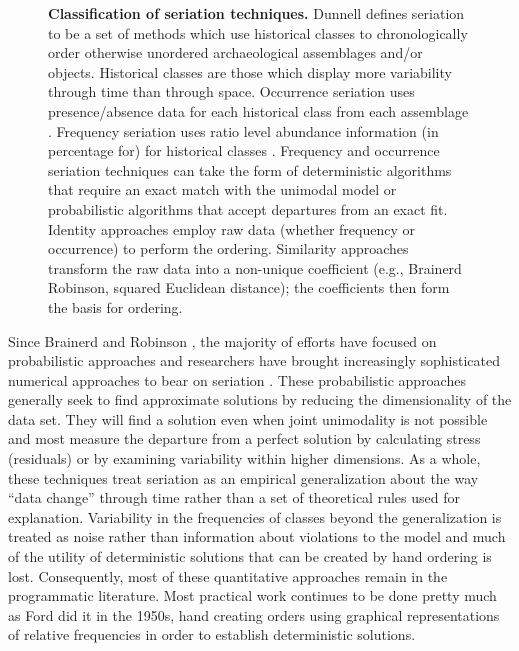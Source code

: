 \documentclass[10pt,letterpaper]{article}
\begin{document}
\begin{figure}[h]
\caption{{\bf Classification of seriation techniques.} Dunnell \cite{Dunnell:1981aa} defines seriation to be a set of methods which use historical classes to chronologically order otherwise unordered archaeological assemblages and/or objects. Historical classes are those which display more variability through time than through space. Occurrence seriation uses presence/absence data for each historical class from each assemblage \cite{Petrie:1899aa,Kroeber1916}. Frequency seriation uses ratio level abundance information (in percentage for) for historical classes \cite{Spier1917,Ford:1935aa,Ford:1962aa}. Frequency and occurrence seriation techniques can take the form of deterministic algorithms that require an exact match with the unimodal model or probabilistic algorithms that accept departures from an exact fit.  Identity approaches employ raw data (whether frequency or occurrence) to perform the ordering. Similarity approaches transform the raw data into a non-unique coefficient (e.g., Brainerd Robinson, squared Euclidean distance); the coefficients then form the basis for ordering. }
\label{fig1}
\end{figure}


Since Brainerd and Robinson \cite{Brainerd1951,Robinson1951}, the majority of efforts have focused on probabilistic approaches and researchers have brought increasingly sophisticated numerical approaches to bear on seriation \cite{Atkins1998Spectral,Bordaz1970aa,Brower1985aa,Buck2000,Djindjian:1984aa,Gargano1996,Gargano2006,Halekoh1999,Halekoh2004,Hubert2011,Kendall1970,Liiv2010aa,Wilkinson1971}. These probabilistic approaches generally seek to find approximate solutions by reducing the dimensionality of the data set. They will find a solution even when joint unimodality is not possible and most measure the departure from a perfect solution by calculating stress (residuals) or by examining variability within higher dimensions. As a whole, these techniques treat seriation as an empirical generalization about the way “data change” through time rather than a set of theoretical rules used for explanation. Variability in the frequencies of classes beyond the generalization is treated as noise rather than information about violations to the model and much of the utility of deterministic solutions that can be created by hand ordering is lost. Consequently, most of these quantitative approaches remain in the programmatic literature. Most practical work continues to be done pretty much as Ford did it in the 1950s, hand creating orders using graphical representations of relative frequencies in order to establish deterministic solutions. 
\end{document}
